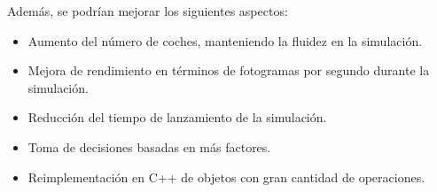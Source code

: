 Además, se podrían mejorar los siguientes aspectos:

\begin{itemize}
    \item Aumento del número de coches, manteniendo la fluidez en la simulación.
    \item Mejora de rendimiento en términos de fotogramas por segundo durante la simulación.
    \item Reducción del tiempo de lanzamiento de la simulación.
    \item Toma de decisiones basadas en más factores.
    \item Reimplementación en C++ de objetos con gran cantidad de operaciones.
\end{itemize}